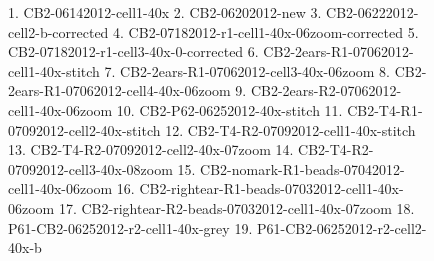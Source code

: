 \documentclass{article}
\begin{document}
\pagestyle{empty}

%

\begin{figure}
  \centering
  \caption{1. CB2-06142012-cell1-40x
2. CB2-06202012-new
3. CB2-06222012-cell2-b-corrected
4. CB2-07182012-r1-cell1-40x-06zoom-corrected
5. CB2-07182012-r1-cell3-40x-0-corrected
6. CB2-2ears-R1-07062012-cell1-40x-stitch
7. CB2-2ears-R1-07062012-cell3-40x-06zoom
8. CB2-2ears-R1-07062012-cell4-40x-06zoom
9. CB2-2ears-R2-07062012-cell1-40x-06zoom
10. CB2-P62-06252012-40x-stitch
11. CB2-T4-R1-07092012-cell2-40x-stitch
12. CB2-T4-R2-07092012-cell1-40x-stitch
13. CB2-T4-R2-07092012-cell2-40x-07zoom
14. CB2-T4-R2-07092012-cell3-40x-08zoom
15. CB2-nomark-R1-beads-07042012-cell1-40x-06zoom
16. CB2-rightear-R1-beads-07032012-cell1-40x-06zoom
17. CB2-rightear-R2-beads-07032012-cell1-40x-07zoom
18. P61-CB2-06252012-r2-cell1-40x-grey
19. P61-CB2-06252012-r2-cell2-40x-b
}
\end{figure}

\clearpage
\end{document}

